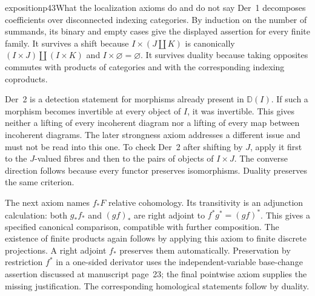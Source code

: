 \begin{dcomment}{exposition}{p43}{What the localization axioms do and do not say}
Der~1 decomposes coefficients over disconnected indexing categories.
By induction on the number of summands, its binary and empty cases give
the displayed assertion for every finite family. It survives a shift
because $I\times(J\amalg K)$ is canonically
$(I\times J)\amalg(I\times K)$ and $I\times\varnothing=\varnothing$.
It survives duality because taking opposites commutes with products of
categories and with the corresponding indexing coproducts.

Der~2 is a detection statement for morphisms already present in
$\mathbb D(I)$. If such a morphism becomes invertible at every object
of $I$, it was invertible. This gives neither a lifting of every
incoherent diagram nor a lifting of every map between incoherent
diagrams. The later strongness axiom addresses a different issue and
must not be read into this one. To check Der~2 after shifting by $J$,
apply it first to the $J$-valued fibres and then to the pairs of
objects of $I\times J$. The converse direction follows because every
functor preserves isomorphisms. Duality preserves the same criterion.

The next axiom names $f_*F$ relative cohomology. Its transitivity is an
adjunction calculation: both $g_*f_*$ and $(gf)_*$ are right adjoint
to $f^*g^*=(gf)^*$. This gives a specified canonical comparison,
compatible with further composition. The existence of finite products
again follows by applying this axiom to finite discrete projections.
A right adjoint $f_*$ preserves them automatically. Preservation by
restriction $f^*$ in a one-sided derivator uses the independent-variable
base-change assertion discussed at manuscript page~23; the final
pointwise axiom supplies the missing justification. The corresponding
homological statements follow by duality.
\end{dcomment}

